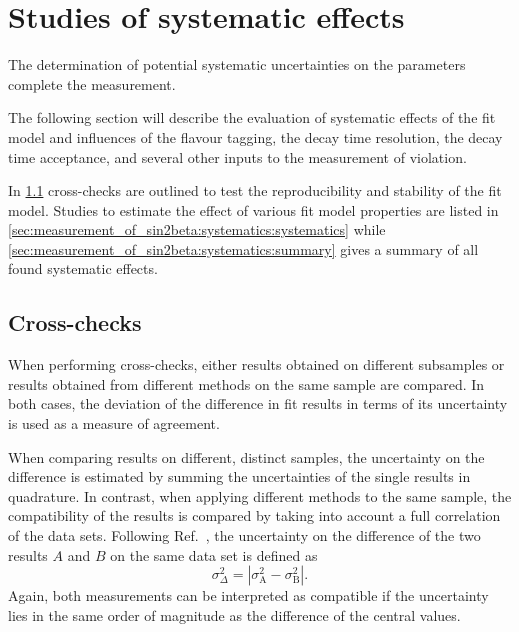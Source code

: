 
\section{Studies of systematic effects}
\label{sec:measurement_of_sin2beta:systematics}

The determination of potential systematic uncertainties on the \CP parameters
complete the measurement.

The following section will describe the evaluation of systematic effects of the
fit model and influences of the flavour tagging, the decay time resolution, the
decay time acceptance, and several other inputs to the measurement of \CP
violation.

In \cref{sec:measurement_of_sin2beta:systematics:cross_checks} cross-checks are
outlined to test the reproducibility and stability of the fit model. Studies to
estimate the effect of various fit model properties are listed in
\cref{sec:measurement_of_sin2beta:systematics:systematics} while
\cref{sec:measurement_of_sin2beta:systematics:summary} gives a summary of all
found systematic effects.

\subsection{Cross-checks}
\label{sec:measurement_of_sin2beta:systematics:cross_checks}

When performing cross-checks, either results obtained on different subsamples or
results obtained from different methods on the same sample are compared. In both
cases, the deviation of the difference in fit results in terms of its
uncertainty is used as a measure of agreement.

When comparing results on different, distinct samples, the uncertainty on the
difference is estimated by summing the uncertainties of the single results in
quadrature. In contrast, when applying different methods to the same sample, the
compatibility of the results is compared by taking into account a full
correlation of the data sets. Following Ref.~\cite{Barlow:2002yb}, the
uncertainty on the difference of the two results $A$ and $B$ on the same data
set is defined as
%
\begin{equation}
  \sigma^2_\Delta = \left\vert\sigma^2_{\text{A}} - \sigma^2_{\text{B}}\right\vert .
\end{equation}
%
Again, both measurements can be interpreted as compatible if the uncertainty
lies in the same order of magnitude as the difference of the central values.

